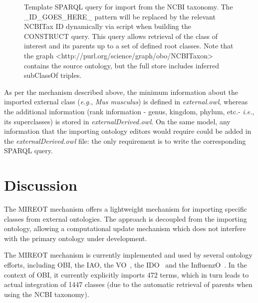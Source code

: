 \documentclass[jou]{ao2e}%
\begin{document}
\begin{figure}[t]
\scriptsize
 
\caption{Template SPARQL query for import from the NCBI taxonomy. The \_ID\_GOES\_HERE\_ pattern will be replaced by the relevant NCBITax ID dynamically via script when building the CONSTRUCT query. This query allows retrieval of the class of interest and its parents up to a set of defined root classes. Note that the graph <http://purl.org/science/graph/obo/NCBITaxon> contains the source ontology, but the full store includes inferred subClassOf triples.}
\label{fig:sparql2}
\end{figure}
As per the mechanism described above, the minimum information about the imported external class (\emph{e.g.}, \emph{Mus musculus}) is defined in \emph{external.owl}, whereas the additional information (rank information - genus, kingdom, phylum, etc.- \emph{i.e.}, its  superclasses) is stored in \emph{ externalDerived.owl}.
On the same model, any information that the importing ontology editors would require could be added in the \emph{externalDerived.owl} file: the only requirement is to write the corresponding SPARQL query.


\section*{Discussion}

The MIREOT mechanism offers a lightweight mechanism for importing specific classes from external ontologies. The approach is decoupled from the importing ontology, allowing a computational update mechanism which does not interfere with the primary ontology under development.

 The \ac{MIREOT} mechanism is currently implemented and used by several ontology efforts, including \ac{OBI}, the \ac{IAO}, the \ac{VO}~\citep{VO}, the \ac{IDO}~\citep{IDO} and the \ac{InfluenzO}~\citep{InfluenzO}.
In the context of \ac{OBI}, it currently explicitly imports 472 terms, which in turn leads to actual integration of 1447 classes (due to the automatic retrieval of parents when using the NCBI taxonomy). 
\end{document}
